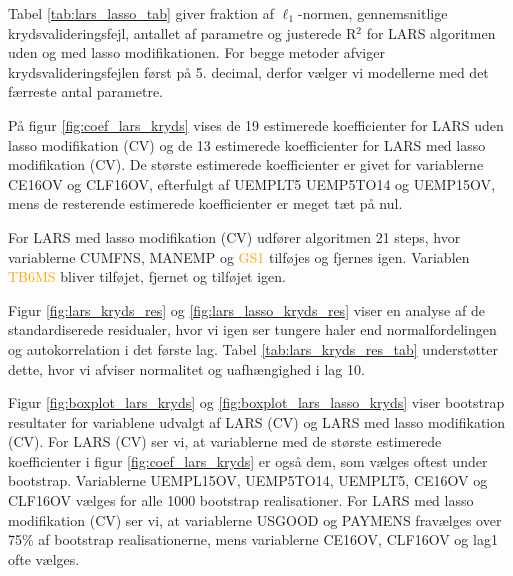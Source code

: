 
Tabel \ref{tab:lars_lasso_tab} giver fraktion af \(\ell_1\)-normen, gennemsnitlige krydsvalideringsfejl, antallet af parametre og justerede R$^2$ for LARS algoritmen uden og med lasso modifikationen. 
For begge metoder afviger krydsvalideringsfejlen først på 5. decimal, derfor vælger vi modellerne med det færreste antal parametre. 


%

%
På figur \ref{fig:coef_lars_kryds} vises de 19 estimerede koefficienter for LARS uden lasso modifikation (CV) og de 13 estimerede koefficienter for LARS med lasso modifikation (CV). 
De største estimerede koefficienter er givet for variablerne \textcolor{blue3}{CE16OV} og \textcolor{blue3}{CLF16OV}, efterfulgt af \textcolor{blue3}{UEMPLT5} \textcolor{blue3}{UEMP5TO14} og \textcolor{blue3}{UEMP15OV}, mens de resterende estimerede koefficienter er meget tæt på nul.


For LARS med lasso modifikation (CV) udfører algoritmen 21 steps, hvor variablerne  \textcolor{chartreuse4}{CUMFNS}, \textcolor{blue3}{MANEMP} og \textcolor{orange}{GS1} tilføjes og fjernes igen. 
Variablen \textcolor{orange}{TB6MS} bliver tilføjet, fjernet og tilføjet igen.  

Figur \ref{fig:lars_kryds_res} og \ref{fig:lars_lasso_kryds_res} viser en analyse af de standardiserede residualer, hvor vi igen ser tungere haler end normalfordelingen og autokorrelation i det første lag. 
Tabel \ref{tab:lars_kryds_res_tab} understøtter dette, hvor vi afviser normalitet og uafhængighed i lag 10. 

Figur \ref{fig:boxplot_lars_kryds} og  \ref{fig:boxplot_lars_lasso_kryds} viser bootstrap resultater for variablene udvalgt af LARS (CV) og LARS med lasso modifikation (CV). 
For LARS (CV) ser vi, at variablerne med de største estimerede koefficienter i figur \ref{fig:coef_lars_kryds} er også dem, som vælges oftest under bootstrap. 
Variablerne \textcolor{blue3}{UEMPL15OV}, \textcolor{blue3}{UEMP5TO14}, \textcolor{blue3}{UEMPLT5}, \textcolor{blue3}{CE16OV} og \textcolor{blue3}{CLF16OV} vælges for alle 1000 bootstrap realisationer.
For LARS med lasso modifikation (CV)  ser vi, at variablerne \textcolor{blue3}{USGOOD} og \textcolor{blue3}{PAYMENS} fravælges over 75\% af bootstrap realisationerne, mens variablerne \textcolor{blue3}{CE16OV}, \textcolor{blue3}{CLF16OV} og \textcolor{blue3}{lag1} ofte vælges. 

